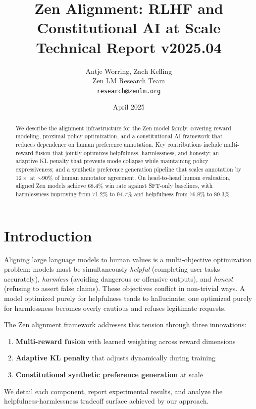 \documentclass[11pt,a4paper]{article}
\title{\textbf{Zen Alignment: RLHF and Constitutional AI at Scale}\\
\large Technical Report v2025.04}
\author{Antje Worring, Zach Kelling \\ Zen LM Research Team\\
\texttt{research@zenlm.org}}
\date{April 2025}
\begin{document}
\maketitle

\begin{abstract}
We describe the alignment infrastructure for the Zen model family, covering reward
modeling, proximal policy optimization, and a constitutional AI framework that reduces
dependence on human preference annotation. Key contributions include multi-reward
fusion that jointly optimizes helpfulness, harmlessness, and honesty; an adaptive
KL penalty that prevents mode collapse while maintaining policy expressiveness; and
a synthetic preference generation pipeline that scales annotation by $12\times$ at
$\sim$90\% of human annotator agreement. On head-to-head human evaluation, aligned
Zen models achieve 68.4\% win rate against SFT-only baselines, with harmlessness
improving from 71.2\% to 94.7\% and helpfulness from 76.8\% to 89.3\%.
\end{abstract}

\section{Introduction}

Aligning large language models to human values is a multi-objective optimization problem:
models must be simultaneously \textit{helpful} (completing user tasks accurately),
\textit{harmless} (avoiding dangerous or offensive outputs), and \textit{honest}
(refusing to assert false claims). These objectives conflict in non-trivial ways.
A model optimized purely for helpfulness tends to hallucinate; one optimized purely
for harmlessness becomes overly cautious and refuses legitimate requests.

The Zen alignment framework addresses this tension through three innovations:

\begin{enumerate}
  \item \textbf{Multi-reward fusion} with learned weighting across reward dimensions
  \item \textbf{Adaptive KL penalty} that adjusts dynamically during training
  \item \textbf{Constitutional synthetic preference generation} at scale
\end{enumerate}

We detail each component, report experimental results, and analyze the
helpfulness-harmlessness tradeoff surface achieved by our approach.
\end{document}
